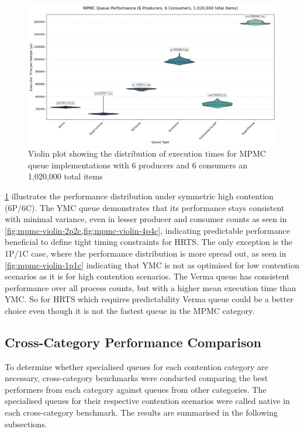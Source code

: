 \begin{figure}[htb]
\centering
\caption{Violin plot showing the distribution of execution times for MPMC queue implementations with 6 producers and 6 consumers an 1,020,000 total items}
\label{fig:mpmc-violin-6p6c}
\includegraphics[width=\textwidth]{images/results/mpmc_performance_violin_6P_6C.png}
\end{figure}

\cref{fig:mpmc-violin-6p6c} illustrates the performance distribution under symmetric high contention (6P/6C). The \ac{YMC} queue demonstrates that its performance stays consistent with minimal variance, even in lesser producer and consumer counts as seen in \cref{fig:mpmc-violin-2p2c,fig:mpmc-violin-4p4c}, indicating predictable performance beneficial to define tight timing constraints for \ac{HRTS}. The only exception is the 1P/1C case, where the performance distribution is more spread out, as seen in \cref{fig:mpmc-violin-1p1c} indicating that \ac{YMC} is not as optimised for low contention scenarios as it is for high contention scenarios. The Verma queue has consistent performance over all process counts, but with a higher mean execution time than \ac{YMC}. So for \ac{HRTS} which requires predictability Verma queue could be a better choice even though it is not the fastest queue in the \ac{MPMC} category.

\subsection{Cross-Category Performance Comparison}
To determine whether specialised queues for each contention category are necessary, cross-category benchmarks were conducted comparing the best performers from each category against queues from other categories. The specialised queues for their respective contention scenarios were called native in each cross-category benchmark. The results are summarised in the following subsections.


